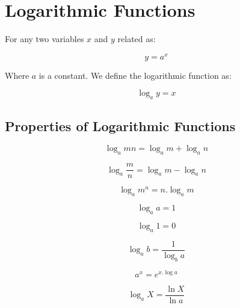 \section{Logarithmic Functions}

For any two variables \(x\) and \(y\) related as:

\begin{equation}
\label{eq}
y = a^x
\end{equation}

Where \( a \) is a constant. We define the logarithmic function as:

\begin{equation}
\label{log}
\log_a{y} = x
\end{equation}

\subsection{\textbf{Properties of Logarithmic Functions}}

\begin{equation}
\label{logmn}
\log_a{mn} = \log_a{m} + \log_a{n}
\end{equation}

\begin{equation}
\label{logm/n}
\log_a {\frac{m}{n}} = \log_a{m} - \log_a{n}
\end{equation}

\begin{equation}
\label{logmton}
\log_a{m^n} = n . \log_a{m}
\end{equation}

\begin{equation}
\label{logatoa}
\log_a{a} = 1
\end{equation}

\begin{equation}
\label{log1}
\log_a{1} = 0
\end{equation}

\begin{equation}
\label{logatob}
\log_a{b} = \frac{1}{\log_b{a}}
\end{equation}

\begin{equation}
\label{exloga}
a^x = e^{x . \log{a}}
\end{equation}

\begin{equation}
\label{logXa}
\log_a{X} = \frac{\ln{X}}{\ln{a}}
\end{equation}
